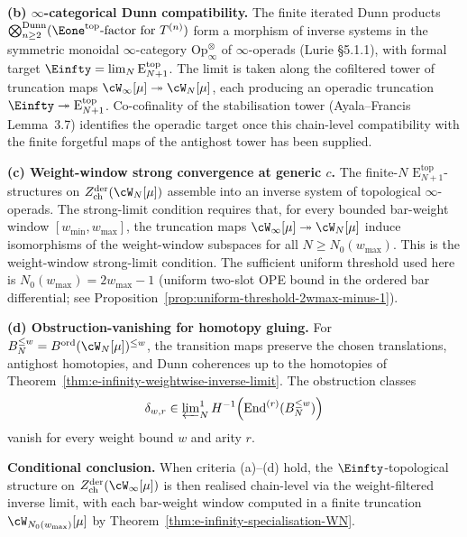 \begin{theorem}
\smallskip
\textbf{(b) $\infty$-categorical Dunn compatibility.}
The finite iterated Dunn products
$\bigotimes^{\mathrm{Dunn}}_{n \ge 2}
(\Eone^{\mathrm{top}}\text{-factor for }T^{(n)})$
form a morphism of inverse systems in the symmetric monoidal
$\infty$-category
$\mathrm{Op}_\infty^{\otimes}$ of $\infty$-operads
\textup{(}Lurie\,\cite{HA}\,§5.1.1\textup{)}, with formal target
$\Einfty = \lim_N \mathrm{E}_{N+1}^{\mathrm{top}}$. The limit is taken
along the cofiltered tower of truncation maps
$\cW_\infty[\mu] \twoheadrightarrow \cW_N[\mu]$, each producing an
operadic truncation $\Einfty \twoheadrightarrow \mathrm{E}_{N+1}^{\mathrm{top}}$.
Co-cofinality of the stabilisation tower
(Ayala--Francis\,\cite{AF15}\,Lemma~3.7) identifies the operadic target
once this chain-level compatibility with the finite forgetful maps of
the antighost tower has been supplied.

\smallskip
\textbf{(c) Weight-window strong convergence at generic $c$.}
The finite-$N$ $\mathrm{E}_{N+1}^{\mathrm{top}}$-structures on
$Z^{\mathrm{der}}_{\mathrm{ch}}(\cW_N[\mu])$ assemble into an inverse
system of topological $\infty$-operads. The strong-limit condition
requires that, for every bounded bar-weight window
$[w_{\min}, w_{\max}]$, the truncation maps
$\cW_\infty[\mu] \twoheadrightarrow \cW_N[\mu]$ induce isomorphisms
of the weight-window subspaces for all $N \ge N_0(w_{\max})$. This is
the weight-window strong-limit condition.
The sufficient uniform threshold used here is
$N_0(w_{\max}) = 2w_{\max} - 1$ (uniform two-slot OPE bound in the
ordered bar differential; see
Proposition~\ref{prop:uniform-threshold-2wmax-minus-1}).

\smallskip
\textbf{(d) Obstruction-vanishing for homotopy gluing.}
For \(B_N^{\le w}=B^{\mathrm{ord}}(\cW_N[\mu])^{\le w}\), the
transition maps preserve the chosen translations, antighost homotopies,
and Dunn coherences up to the homotopies of
Theorem~\textup{\ref{thm:e-infinity-weightwise-inverse-limit}}. The
obstruction classes
\[
 \delta_{w,r}\in
 \varprojlim\nolimits_N^{1}
 H^{-1}\!\left(
 \operatorname{End}^{(r)}(B_N^{\le w})
 \right)
\]
vanish for every weight bound \(w\) and arity \(r\).

\smallskip
\textbf{Conditional conclusion.}
When criteria \textup{(a)--(d)} hold, the
$\Einfty$-topological structure on
$Z^{\mathrm{der}}_{\mathrm{ch}}(\cW_\infty[\mu])$ is then realised
chain-level via the weight-filtered inverse limit, with each bar-weight
window computed in a finite truncation $\cW_{N_0(w_{\max})}[\mu]$ by
Theorem~\textup{\ref{thm:e-infinity-specialisation-WN}}.
\end{theorem}


